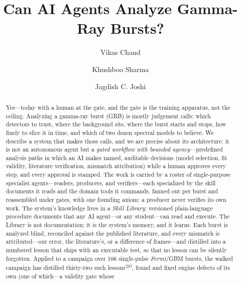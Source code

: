 \documentclass[twocolumn]{aastex631}
\newcommand{\prov}{\textsuperscript{(p)}}   %
\begin{document}
\title{Can AI Agents Analyze Gamma-Ray Bursts?}

\author{Vikas Chand}

\author{Khushboo Sharma}

\author{Jagdish C. Joshi}

\begin{abstract}
Yes---today with a human at the gate, and the gate is the training
apparatus, not the ceiling. Analyzing a
gamma-ray burst (GRB) is mostly judgement calls: which detectors to trust,
where the background sits, where the burst starts and stops, how finely to
slice it in time, and which of two dozen spectral models to believe.
We describe a system that makes those calls, and we are precise about its
architecture: it is not an autonomous agent but a \emph{gated workflow with
bounded agency}---predefined analysis paths in which an AI makes named,
auditable decisions (model selection, fit validity, literature verification,
mismatch attribution) while a human approves every step, and every approval
is stamped. The work is carried by a roster of single-purpose specialist
agents---readers, producers, and verifiers---each specialized by the skill
documents it reads and the domain tools it commands, fanned out per burst
and reassembled under gates, with one founding axiom: a producer never
verifies its own work. The system's knowledge lives in a \emph{Skill Library}: versioned
plain-language procedure documents that any AI agent---or any student---can
read and execute. The Library is not documentation; it is the system's
memory, and it learns. Each burst is analyzed blind, reconciled against the
published literature, and every mismatch is attributed---our error, the
literature's, or a difference of frames---and distilled into a numbered
lesson that ships with an executable test, so that no lesson can be silently
forgotten. Applied to a campaign over 106 single-pulse \textit{Fermi}/GBM
bursts, the walked campaign has distilled thirty-two such lessons\prov{},
found and fixed engine defects of its own (one of which---a validity gate whose

\end{abstract}
\end{document}
